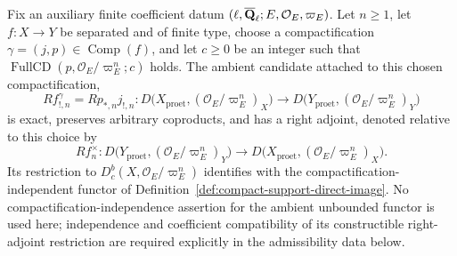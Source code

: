 \begin{proposition}
\label{prop:ambient-exceptional-adjoint}


Fix an auxiliary finite coefficient datum
\((\ell,\overline{\mathbf Q}_\ell;E,\mathcal O_E,\varpi_E)\).  Let \(n\geq1\), let
\(f:X\to Y\) be separated and of finite type, choose a compactification
\(\gamma=(j,p)\in\operatorname{Comp}(f)\), and let \(c\geq0\) be an
integer such that
\(\operatorname{FullCD}(p,\mathcal O_E/\varpi_E^n;c)\) holds.  The ambient
candidate attached to this chosen compactification,
\[
 Rf_{!,n}^{\gamma}=Rp_{*,n}j_{!,n}:
 D\bigl(X_{\mathrm{proet}},(\mathcal O_E/\varpi_E^n)_X\bigr)
 \longrightarrow
 D\bigl(Y_{\mathrm{proet}},(\mathcal O_E/\varpi_E^n)_Y\bigr)
\]
is exact, preserves arbitrary coproducts, and has a right adjoint, denoted
relative to this choice by
\[
 Rf_n^{\times}:
 D\bigl(Y_{\mathrm{proet}},(\mathcal O_E/\varpi_E^n)_Y\bigr)
 \longrightarrow
 D\bigl(X_{\mathrm{proet}},(\mathcal O_E/\varpi_E^n)_X\bigr).
\]
Its restriction to \(D^b_c(X,\mathcal O_E/\varpi_E^n)\) identifies with the
compactification-independent functor of
Definition~\ref{def:compact-support-direct-image}.  No
compactification-independence assertion for the ambient unbounded functor is
used here; independence and coefficient compatibility of its constructible
right-adjoint restriction are required explicitly in the admissibility data
below.
\end{proposition}



